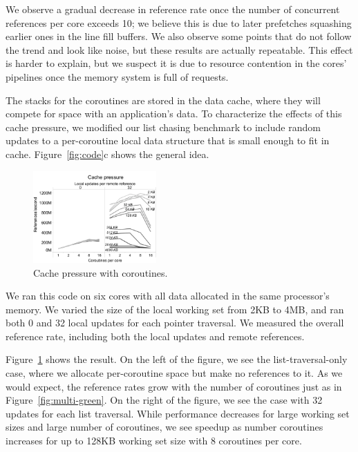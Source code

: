 \documentclass[10pt,nocopyrightspace,preprint]{sigplanconf}
\begin{document}
We observe a gradual decrease in reference rate once the number of
concurrent references per core exceeds 10; we believe this is due to
later prefetches squashing earlier ones in the line fill buffers. We
also observe some points that do not follow the trend and look like noise, but these results are actually repeatable. This effect is harder to explain, but we suspect it is
due to resource contention in the cores' pipelines once the memory
system is full of requests.



The stacks for the coroutines are stored in the data cache, where they
will compete for space with an application's data. To characterize the
effects of this cache pressure, we modified our list chasing benchmark
to include random updates to a per-coroutine local data structure that
is small enough to fit in cache. Figure~\ref{fig:code}c shows the
general idea.

\begin{figure}[h]
  \begin{center}
    \includegraphics[width=0.42\textwidth]{figures/cache-pressure-edited.pdf}
  \end{center}
  \caption{Cache pressure with coroutines.}
  \label{fig:cache-pressure}
\end{figure}

We ran this code on six cores with all data allocated in the same
processor's memory. We varied the size of the local working set from 2KB
to 4MB, and ran both 0 and 32 local updates for each pointer
traversal. We measured the overall reference rate, including both the local updates and remote references.

Figure~\ref{fig:cache-pressure} shows the result. On the left of the
figure, we see the list-traversal-only case, where we allocate
per-coroutine space but make no references to it. As we would expect,
the reference rates grow with the number of coroutines just as in
Figure~\ref{fig:multi-green}. On the right of the figure, we see the
case with 32 updates for each list traversal. While performance
decreases for large working set sizes and large number of coroutines,
we see speedup as number coroutines increases for up to 128KB working set size with 8 coroutines per
core. 
\end{document}

